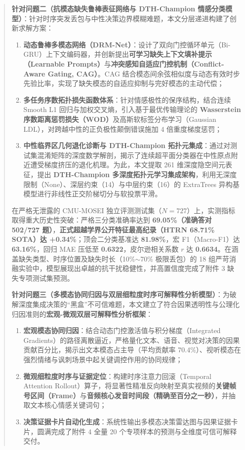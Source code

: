 \begin{abstract}
\textbf{针对问题二（抗模态缺失鲁棒表征网络与 DTH-Champion 情感分类模型）}：针对时序突发丢包与中性决策边界模糊难题，本文分层递进构建了创新求解方案：
\begin{enumerate}
    \item \textbf{动态鲁棒多模态网络（DRM-Net）}：设计了双向门控循环单元（Bi-GRU）上下文编码器，并创新提出\textbf{可学习缺失上下文填补提示（Learnable Prompts）}与\textbf{冲突感知自适应门控机制（Conflict-Aware Gating, CAG）}。CAG 结合模态间余弦相似度与动态有效时步先验比率，实现了缺失模态的自适应抑制与完好模态的主动代偿；
    \item \textbf{多任务序数拓扑损失函数体系}：针对情感极性的保序结构，结合连续 Smooth L1 回归与加权交叉熵，引入基于最优传输理论的 \textbf{Wasserstein 序数距离惩罚损失（WOD）}及高斯软标签分布学习（Gaussian LDL），对跨越中性的正负极性颠倒错误施加 4 倍重度梯度惩罚；
    \item \textbf{中性临界区几何退化诊断与 DTH-Champion 拓扑元集成}：通过对测试集混淆矩阵的深度数学解剖，揭示了连续超平面分类器在中性原点附近遭受梯度挤压的退化机理。为此，本文提取 261 维深度隐空间元表征，提出 \textbf{DTH-Champion 多深度拓扑元学习集成架构}，利用无深度限制（None）、深层约束（14）与中层约束（16）的 ExtraTrees 异构基模型进行非线性正交阶梯切分与软投票平滑。
\end{enumerate}
在严格无泄露的 CMU-MOSEI 独立评测测试集（$N=727$）上，实测指标取得重大历史性突破：严格三分类准确率达到 \textbf{69.05\%（准确答对 502/727 题）}，\textbf{正式超越学界公开特征最高纪录（HTRN 68.71\% SOTA）达 +0.34\%}；顶会二分类基准达 \textbf{81.98\%}，宏 F1（Macro-F1）达 \textbf{63.16\%}，回归 MAE 压低至 \textbf{0.6322}，皮尔逊相关系数 $r$ 达 \textbf{0.6634}。在涵盖缺失类型、时序位置及缺失时长（10\%$\sim$70\% 极限丢包）的 18 组严苛消融实验中，模型展现出卓越的抗干扰稳健性，并高置信度完成了附件 3 缺失专项测试集预测。

\textbf{针对问题三（多模态协同归因与双层细粒度时序可解释性分析模型）}：为破解深度集成决策的“黑盒”不可信难题，本文建立了符合因果透明性与公理化归因准则的\textbf{宏观-微观双层可解释性分析框架}：
\begin{enumerate}
    \item \textbf{宏观模态协同归因}：结合动态门控激活值与积分梯度（Integrated Gradients）的路径离散逼近，严格量化文本、语音、视觉对决策的因果贡献百分比，揭示出文本模态占主导（平均贡献率 70.4\%）、视听模态在强烈情绪与讽刺场景中起关键调控作用的协同规律；
    \item \textbf{微观细粒度时序与证据定位}：构建时序注意力回滚（Temporal Attention Rollout）算子，将显著性精准反向映射至真实视频的\textbf{关键帧号区间（Frame）}与\textbf{音频核心发音时间段（精确至百分之一秒）}，并抽取文本核心情感关键词句；
    \item \textbf{决策证据卡片自动化生成}：系统性输出多模态决策雷达图与因果证据卡片，圆满完成了附件 4 全量 20 个专项样本的预测与全维度可信可解释交付。
\end{enumerate}


\end{abstract}
